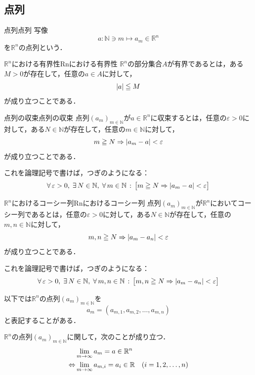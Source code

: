 \newpage

\subsection{点列}

\begin{definition}{点列}{点列}
  写像
  \[
    a \colon \mathbb{N} \ni m \longmapsto a_m \in \mathbb{R}^n
  \]
  を$\mathbb{R}^n$の点列という．
\end{definition}

\begin{definition}{$\mathbb{R}^n$における有界性}{Rnにおける有界性}
  $\mathbb{R}^n$の部分集合$A$が有界であるとは，ある$M>0$が存在して，任意の$a \in A$に対して，
  \[
    \lvert a\rvert \leqq M
  \]
  が成り立つことである．
\end{definition}

\begin{definition}{点列の収束}{点列の収束}
  点列$(a_m)_{m \in \mathbb{N}}$が$a \in \mathbb{R}^n$に収束するとは，任意の$\varepsilon >0$に対して，ある$N \in \mathbb{N}$が存在して，任意の$m \in \mathbb{N}$に対して，
  \[
    m \geqq N \mathrel{\Rightarrow} \lvert a_m -a\rvert < \varepsilon
  \]
  が成り立つことである．

  これを論理記号で書けば，つぎのようになる：
  \[
    \forall\, \varepsilon > 0 ,\; \exists\, N \in \mathbb{N} ,\; \forall\, m \in \mathbb{N} \,:\,
    \bigl[ m \geqq N \mathrel{\Rightarrow} \lvert a_m - a\rvert < \varepsilon \bigr]
  \]
\end{definition}

\begin{definition}{$\mathbb{R}^n$におけるコーシー列}{Rnにおけるコーシー列}
  点列$(a_m)_{m \in \mathbb{N}}$が$\mathbb{R}^n$においてコーシー列であるとは，任意の$\varepsilon >0$に対して，ある$N \in \mathbb{N}$が存在して，任意の$m,n \in \mathbb{N}$に対して，
  \[
    m,n \geqq N \mathrel{\Rightarrow} \lvert a_m -a_n\rvert < \varepsilon
  \]
  が成り立つことである．

  これを論理記号で書けば，つぎのようになる：
  \[
    \forall\, \varepsilon > 0 ,\; \exists\, N \in \mathbb{N} ,\; \forall\, m, n \in \mathbb{N} \,:\,
    \bigl[ m, n \geqq N \mathrel{\Rightarrow} \lvert a_m - a_n\rvert < \varepsilon \bigr]
  \]
\end{definition}

以下では$\mathbb{R}^n$の点列$(a_m)_{m \in \mathbb{N}}$を
\[
  a_m = (a_{m,1},a_{m,2},\ldots,a_{m,n})
\]
と表記することがある．

\begin{theorem}{}{}
  $\mathbb{R}^n$の点列$(a_m)_{m \in \mathbb{N}}$に関して，次のことが成り立つ．
\begin{align*}
  & \lim_{m \to \infty} a_m = a \in \mathbb{R}^n \\
  \mathrel{\Leftrightarrow} & \lim_{m \to \infty} a_{m,i} = a_i \in \mathbb{R} \quad (i=1,2,\ldots,n)
\end{align*}
\end{theorem}

